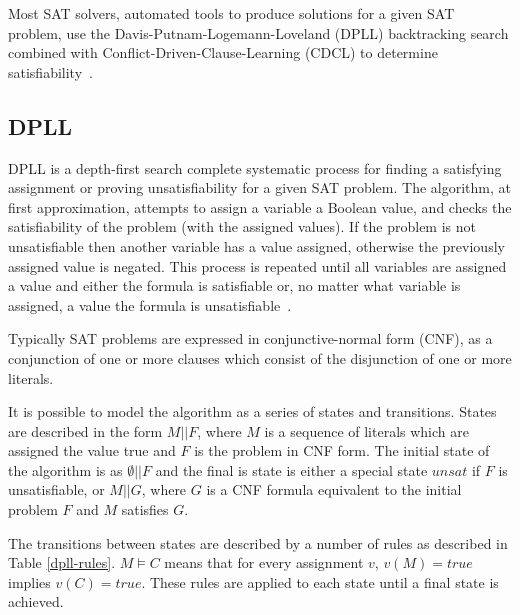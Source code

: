 \documentclass[]{final_report}
\begin{document}
Most SAT solvers, automated tools to produce solutions for a given SAT problem, use the Davis-Putnam-Logemann-Loveland (DPLL) backtracking search combined with Conflict-Driven-Clause-Learning (CDCL) to determine satisfiability~\cite{zhang2001efficient, gomes2008satisfiability}.

\subsection{DPLL}
DPLL is a depth-first search complete systematic process for finding a satisfying assignment or proving unsatisfiability for a given SAT problem.  The algorithm, at first approximation, attempts to assign a variable a Boolean value, and checks the satisfiability of the problem (with the assigned values). If the problem is not unsatisfiable then another variable has a value assigned, otherwise the previously assigned value is negated. This process is repeated until all variables are assigned a value and either the formula is satisfiable or, no matter what variable is assigned, a value the formula is unsatisfiable~\cite{sattosmt}.

Typically SAT problems are expressed in conjunctive-normal form (CNF), as a conjunction of one or more clauses which consist of the disjunction of one or more literals.

It is possible to model the algorithm as a series of states and transitions. States are described in the form $M || F$, where $M$ is a sequence of literals which are assigned the value true and $F$ is the problem in CNF form. The initial state of the algorithm is as $\emptyset || F $ and the final is state is either a special state $unsat$ if $F$ is unsatisfiable, or $M || G $, where $G$ is a CNF formula equivalent to the initial problem $F$ and $M$ satisfies $G$. 

The transitions between states are described by a number of rules as described in Table \ref{dpll-rules}. $M \models C$  means that for every assignment $v$, $v(M) = true$ implies $v(C) = true$. These rules are applied to each state until a final state is achieved.
\end{document}
